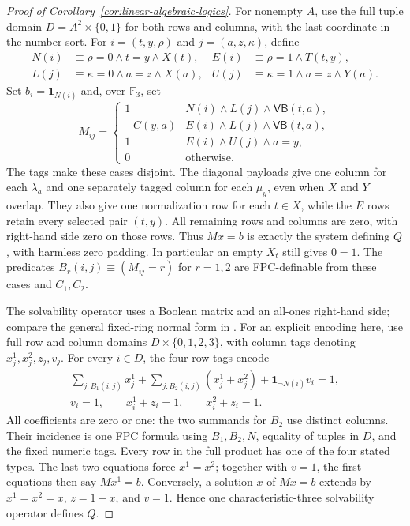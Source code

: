 \begin{proof}[Proof of Corollary~\ref{cor:linear-algebraic-logics}]
For nonempty $A$, use the full tuple domain $D=A^2\times\{0,1\}$ for both
rows and columns, with the last coordinate in the number sort. For
$i=(t,y,\rho)$ and $j=(a,z,\kappa)$, define
\[
\begin{aligned}
 N(i)&\equiv \rho=0\wedge t=y\wedge X(t),&
 E(i)&\equiv \rho=1\wedge T(t,y),\\
 L(j)&\equiv \kappa=0\wedge a=z\wedge X(a),&
 U(j)&\equiv \kappa=1\wedge a=z\wedge Y(a).
\end{aligned}
\]
Set $b_i=\mathbf{1}_{N(i)}$ and, over $\mathbb F_3$, set
\[
 M_{ij}=
 \begin{cases}
 1&N(i)\wedge L(j)\wedge\mathsf{VB}(t,a),\\
 -C(y,a)&E(i)\wedge L(j)\wedge\mathsf{VB}(t,a),\\
 1&E(i)\wedge U(j)\wedge a=y,\\
 0&\text{otherwise}.
 \end{cases}
\]
The tags make these cases disjoint. The diagonal payloads give one column
for each $\lambda_a$ and one separately tagged column for each $\mu_y$,
even when $X$ and $Y$ overlap. They also give one normalization row for
each $t\in X$, while the $E$ rows retain every selected pair $(t,y)$.
All remaining rows and columns are zero, with right-hand side zero on
those rows. Thus $Mx=b$ is exactly the system defining $Q$, with harmless
zero padding. In particular an empty $X_t$ still gives $0=1$.
The predicates $B_r(i,j)\equiv(M_{ij}=r)$ for $r=1,2$ are FPC-definable
from these cases and $C_1,C_2$.

The solvability operator uses a Boolean matrix and an all-ones
right-hand side; compare the general fixed-ring normal form in
\cite[Lemma~4.1]{dghkp2013}. For an explicit encoding here, use full row
and column domains $D\times\{0,1,2,3\}$, with column tags denoting
$x^1_j,x^2_j,z_j,v_j$. For every $i\in D$, the four row tags encode
\[
\begin{gathered}
 \sum_{j:B_1(i,j)}x^1_j+
 \sum_{j:B_2(i,j)}(x^1_j+x^2_j)+\mathbf{1}_{\neg N(i)}v_i=1,\\
 v_i=1,\qquad x^1_i+z_i=1,\qquad x^2_i+z_i=1.
\end{gathered}
\]
All coefficients are zero or one: the two summands for $B_2$ use distinct
columns. Their incidence is one FPC formula using $B_1,B_2,N$, equality
of tuples in $D$, and the fixed numeric tags. Every row in the full
product has one of the four stated types. The last two equations force
$x^1=x^2$; together with $v=1$, the first equations then say $Mx^1=b$.
Conversely, a solution $x$ of $Mx=b$ extends by
$x^1=x^2=x$, $z=1-x$, and $v=1$. Hence one characteristic-three
solvability operator defines $Q$.


\end{proof}
